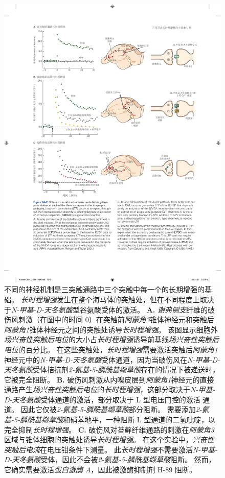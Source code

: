 \begin{figure}[htbp]
	\centering
	\includegraphics[width=1.0\linewidth]{chap54/fig_54_2}
	\caption{不同的神经机制是三突触通路中三个突触中每一个的长期增强的基础。
		\textit{长时程增强}发生在整个海马体的突触处，但在不同程度上取决于\textit{N-甲基-D-天冬氨酸}型谷氨酸受体的激活。
		\textbf{A.} \textit{谢弗侧支}纤维的破伤风刺激（在图中的时间 0）在突触前\textit{阿蒙角3}锥体神经元和突触后\textit{阿蒙角1}锥体神经元之间的突触处诱导\textit{长时程增强}。
		该图显示细胞外\textit{场兴奋性突触后电位}的大小占\textit{长时程增强}诱导前基线\textit{场兴奋性突触后电位}的百分比。
		在这些突触处，\textit{长时程增强}需要激活突触后\textit{阿蒙角1}神经元中的\textit{N-甲基-D-天冬氨酸}受体通道，因为当破伤风在\textit{N-甲基-D-天冬氨酸}受体拮抗剂\textit{2-氨基-5-膦酰基缬草酸}存在的情况下被递送时，它被完全阻断\cite{morgan2001electrical}。
		\textbf{B.} 破伤风刺激从内嗅皮层到\textit{阿蒙角1}神经元的直接通路产生\textit{场兴奋性突触后电位}的\textit{长时程增强}，这部分取决于\textit{N-甲基-D-天冬氨酸}受体通道的激活，部分取决于 L 型电压门控的激活  通道。
		因此它仅被\textit{2-氨基-5-膦酰基缬草酸}部分阻断。
		需要添加\textit{2-氨基-5-膦酰基缬草酸}和硝苯地平，一种阻断 L 型通道的二氢吡啶，以完全抑制\textit{长时程增强}。
		\textbf{C.} 破伤风对苔藓纤维通路的刺激在\textit{阿蒙角3}区域与锥体细胞的突触处诱导\textit{长时程增强}。
		在这个实验中，\textit{兴奋性突触后电流}在电压钳条件下测量。
		此\textit{长时程增强}不需要激活\textit{N-甲基-D-天冬氨酸}受体，因此不会被\textit{2-氨基-5-膦酰基缬草酸}阻断。
		然而，它确实需要激活\textit{蛋白激酶 A}，因此被激酶抑制剂 H-89 阻断\cite{zalutsky1990comparison}。}
	\label{fig:54_2}
\end{figure}


